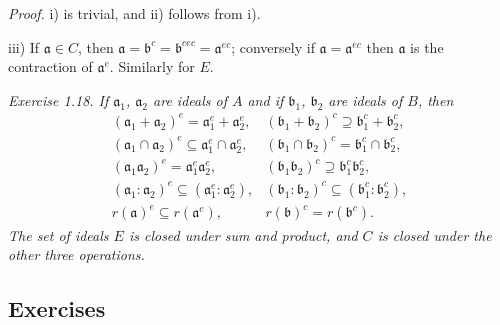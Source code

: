 \noindent\textit{Proof.} i) is trivial, and ii) follows from i).

iii) If $\mathfrak a\in C$, then $\mathfrak a=\mathfrak b^c=\mathfrak b^{cec}=\mathfrak a^{ec}$; conversely if $\mathfrak a=\mathfrak a^{ec}$ then $\mathfrak a$ is the contraction of $\mathfrak a^e$. Similarly for $E$. \proofbox

\noindent\textit{Exercise 1.18. If $\mathfrak a_1$, $\mathfrak a_2$ are ideals of $A$ and if $\mathfrak b_1$, $\mathfrak b_2$ are ideals of $B$, then}
\[
\begin{array}{ll}
(\mathfrak a_1+\mathfrak a_2)^e=\mathfrak a_1^e+\mathfrak a_2^e,
& (\mathfrak b_1+\mathfrak b_2)^c\supseteq\mathfrak b_1^c+\mathfrak b_2^c,\\
(\mathfrak a_1\cap\mathfrak a_2)^e\subseteq\mathfrak a_1^e\cap\mathfrak a_2^e,
& (\mathfrak b_1\cap\mathfrak b_2)^c=\mathfrak b_1^c\cap\mathfrak b_2^c,\\
(\mathfrak a_1\mathfrak a_2)^e=\mathfrak a_1^e\mathfrak a_2^e,
& (\mathfrak b_1\mathfrak b_2)^c\supseteq\mathfrak b_1^c\mathfrak b_2^c,\\
(\mathfrak a_1:\mathfrak a_2)^e\subseteq(\mathfrak a_1^e:\mathfrak a_2^e),
& (\mathfrak b_1:\mathfrak b_2)^c\subseteq(\mathfrak b_1^c:\mathfrak b_2^c),\\
r(\mathfrak a)^e\subseteq r(\mathfrak a^e),
& r(\mathfrak b)^c=r(\mathfrak b^c).
\end{array}
\]
\textit{The set of ideals $E$ is closed under sum and product, and $C$ is closed under the other three operations.}

\subsection{Exercises}

